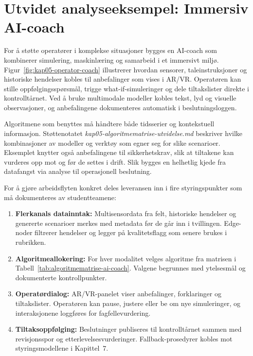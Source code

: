 \section{Utvidet analyseeksempel: Immersiv AI-coach}
For å støtte operatører i komplekse situasjoner bygges en AI-coach som kombinerer simulering, maskinlæring og samarbeid i et immersivt miljø. Figur~\ref{fig:kap05-operator-coach} illustrerer hvordan sensorer, taleinstruksjoner og historiske hendelser kobles til anbefalinger som vises i AR/VR. Operatøren kan stille oppfølgingsspørsmål, trigge what-if-simuleringer og dele tiltakslister direkte i kontrolltårnet. Ved å bruke multimodale modeller kobles tekst, lyd og visuelle observasjoner, og anbefalingene dokumenteres automatisk i beslutningsloggen.

Algoritmene som benyttes må håndtere både tidsserier og kontekstuell informasjon. Støttenotatet \textit{kap05-algoritmematrise-utvidelse.md} beskriver hvilke kombinasjoner av modeller og verktøy som egner seg for slike scenarioer. Eksemplet knytter også anbefalingene til sikkerhetskrav, slik at tiltakene kan vurderes opp mot \citet{iec62443-2-1} og \citet{eu2022nis2} før de settes i drift. Slik bygges en helhetlig kjede fra datafangst via analyse til operasjonell beslutning.

For å gjøre arbeidsflyten konkret deles leveransen inn i fire styringspunkter som må dokumenteres av studentteamene:
\begin{enumerate}
    \item \textbf{Flerkanals datainntak:} Multisensordata fra felt, historiske hendelser og genererte scenarioer merkes med metadata før de går inn i tvillingen. Edge-noder filtrerer hendelser og legger på kvalitetsflagg som senere brukes i rubrikken.
    \item \textbf{Algoritmeallokering:} For hver modalitet velges algoritme fra matrisen i Tabell~\ref{tab:algoritmematrise-ai-coach}. Valgene begrunnes med ytelsesmål og dokumenterte kontrollpunkter.
    \item \textbf{Operatørdialog:} AR/VR-panelet viser anbefalinger, forklaringer og tiltakslister. Operatøren kan pause, justere eller be om nye simuleringer, og interaksjonene loggføres for fagfellevurdering.
    \item \textbf{Tiltaksoppfølging:} Beslutninger publiseres til kontrolltårnet sammen med revisjonsspor og etterlevelsesvurderinger. Fallback-prosedyrer kobles mot styringsmodellene i Kapittel~7.
\end{enumerate}

